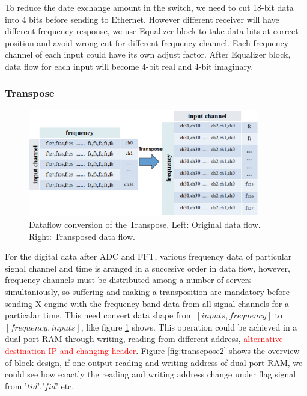 \documentclass{ws-jai}
\begin{document}
	To reduce the date exchange amount in the switch, we need to cut 18-bit data into 4 bits before sending to Ethernet.  However different receiver will have different frequency response, we use Equalizer block to take data bits at correct position and avoid wrong cut for different frequency channel. Each frequency channel of each input could have its own adjust factor. After Equalizer block, data flow for each input will become 4-bit real and 4-bit imaginary. 

\subsubsection{Transpose\label{sec:Transpose}}	
\begin{figure}[t]
 \centering
 \includegraphics[width=0.9\textwidth]{./picture/transpose.eps}
\caption{Dataflow conversion of the Transpose. Left: Original data flow. Right: Transposed data flow.\label{fig:transepose}}
\end{figure}


   For the digital data after ADC and FFT, various frequency data of particular signal channel and time  is aranged in a succesive order in data flow,  however,  frequency channels must be distributed among a number of servers simultaniously, so suffering and making a transposition are mandatory before sending X engine with the frequency band data from all signal channels for a particalar time.  
        This need convert data shape from $[inputs,frequency]$ to $[frequency,inputs]$, like figure \ref{fig:transepose} shows. This operation could be achieved in a dual-port RAM through writing, reading from different address,\textcolor{red}{ alternative destination IP and changing header}.  Figure \ref{fig:transepose2} shows the overview of block design, if one output reading and writing address of dual-port RAM, we could see how exactly the reading and writing address change under flag signal from '$tid$','$fid$' etc.
\end{document}
